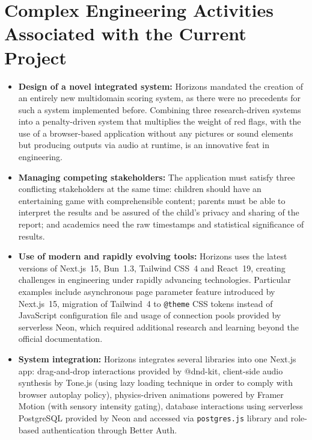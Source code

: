 \documentclass[12pt,a4paper,oneside]{report}
\begin{document}
\section{Complex Engineering Activities Associated with the Current Project}

\begin{itemize}[leftmargin=0.5in]
  \item \textbf{Design of a novel integrated system:} Horizons mandated the creation of an entirely new multidomain scoring system, as there were no precedents for such a system implemented before. Combining three research-driven systems into a penalty-driven system that multiplies the weight of red flags, with the use of a browser-based application without any pictures or sound elements but producing outputs via audio at runtime, is an innovative feat in engineering.

  \item \textbf{Managing competing stakeholders:} The application must satisfy three conflicting stakeholders at the same time: children should have an entertaining game with comprehensible content; parents must be able to interpret the results and be assured of the child’s privacy and sharing of the report; and academics need the raw timestamps and statistical significance of results.

  \item \textbf{Use of modern and rapidly evolving tools:} Horizons uses the latest versions of Next.js~15, Bun~1.3, Tailwind CSS~4 and React~19, creating challenges in engineering under rapidly advancing technologies. Particular examples include asynchronous page parameter feature introduced by Next.js~15, migration of Tailwind~4 to \texttt{@theme} CSS tokens instead of JavaScript configuration file and usage of connection pools provided by serverless Neon, which required additional research and learning beyond the official documentation.

  \item \textbf{System integration:} Horizons integrates several libraries into one Next.js app: drag-and-drop interactions provided by @dnd-kit, client-side audio synthesis by Tone.js (using lazy loading technique in order to comply with browser autoplay policy), physics-driven animations powered by Framer Motion (with sensory intensity gating), database interactions using serverless PostgreSQL provided by Neon and accessed via \texttt{postgres.js} library and role-based authentication through Better Auth.
\end{itemize}
\end{document}
